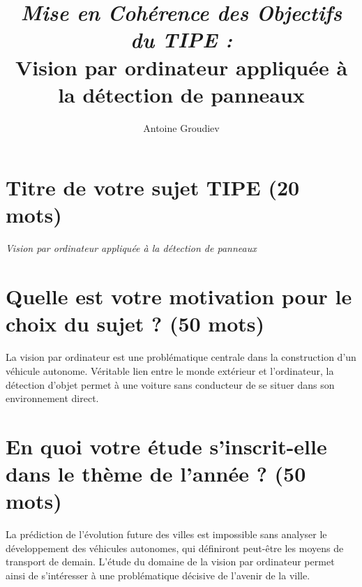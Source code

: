 \documentclass[12pt,a4paper]{article}
\author{Antoine Groudiev}
\title{\textit{Mise en Cohérence des Objectifs du TIPE :}\\Vision par ordinateur appliquée à la détection de panneaux}
\date{}
\begin{document}
\maketitle

\section{Titre de votre sujet TIPE (20 mots)}
\begin{center}
    \vskip-0.2cm
    \large \textit{Vision par ordinateur appliquée à la détection de panneaux}
\end{center}

\section{Quelle est votre motivation pour le choix du sujet ? (50 mots)}
La vision par ordinateur est une problématique centrale dans la construction d’un véhicule autonome. Véritable lien entre le monde extérieur et l’ordinateur, la détection d’objet permet à une voiture sans conducteur de se situer dans son environnement direct. 

\section{En quoi votre étude s'inscrit-elle dans le thème de l'année ? (50 mots)}
La prédiction de l’évolution future des villes est impossible sans analyser le développement des véhicules autonomes, qui définiront peut-être les moyens de transport de demain. L’étude du domaine de la vision par ordinateur permet ainsi de s’intéresser à une problématique décisive de l’avenir de la ville.
\end{document}
